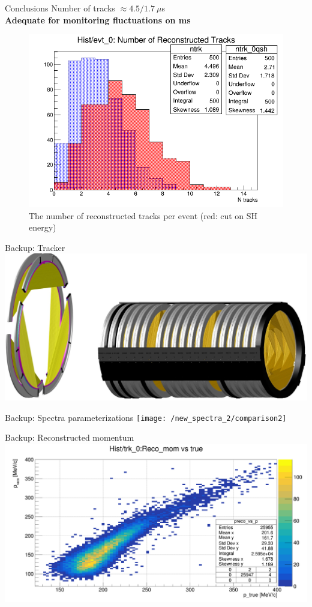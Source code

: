 \documentclass[10pt]{beamer}
\begin{document}
\begin{frame}{Conclusions}
\centering
Number of tracks $\approx 4.5/1.7\ \mu$s\\\textbf{Adequate for monitoring fluctuations on ms}
\begin{figure}
\includegraphics[scale=0.38]{plots/mix/mix500_trk}
\caption{The number of reconstructed tracks per event (red: cut on SH energy)}
\end{figure}
\end{frame}

\begin{frame}{Backup: Tracker}
\centering
\includegraphics[scale=0.4]{mu2e_tracker}
\end{frame}

\begin{frame}{Backup: Spectra parameterizations}
\centering
\texttt{[image: /new\_spectra\_2/comparison2]}
\end{frame}

\begin{frame}{Backup: Reconstructed momentum}
\centering
\includegraphics[width=\textwidth]{FR/PrecoVsP}
\end{frame}
\end{document}
